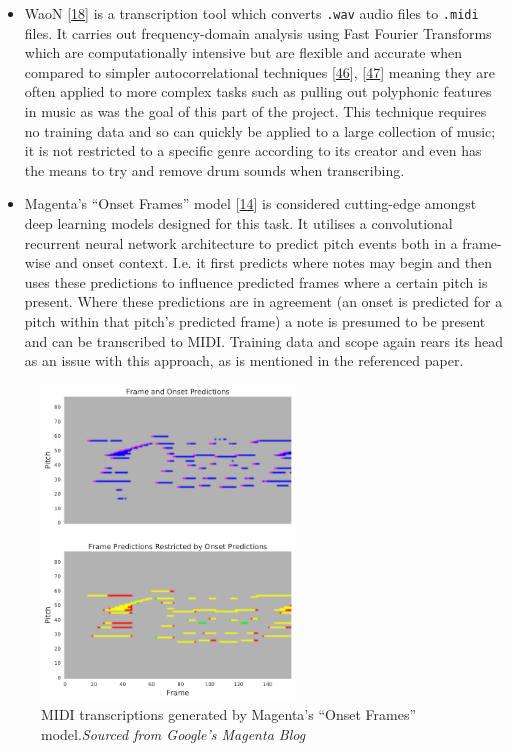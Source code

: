 \documentclass[12pt,]{article}
\providecommand{\tightlist}{%
  \setlength{\itemsep}{0pt}\setlength{\parskip}{0pt}}
\begin{document}
\begin{itemize}
\tightlist
\item
  WaoN {[}\protect\hyperlink{ref-waon}{18}{]} is a transcription tool
  which converts \texttt{.wav} audio files to \texttt{.midi} files. It
  carries out frequency-domain analysis using Fast Fourier Transforms
  which are computationally intensive but are flexible and accurate when
  compared to simpler autocorrelational techniques
  {[}\protect\hyperlink{ref-klapuri2004automatic}{46}{]},
  {[}\protect\hyperlink{ref-gerhard2003pitch}{47}{]} meaning they are
  often applied to more complex tasks such as pulling out polyphonic
  features in music as was the goal of this part of the project. This
  technique requires no training data and so can quickly be applied to a
  large collection of music; it is not restricted to a specific genre
  according to its creator and even has the means to try and remove drum
  sounds when transcribing.
\item
  Magenta's ``Onset Frames'' model
  {[}\protect\hyperlink{ref-hawthorne2017onsets}{14}{]} is considered
  cutting-edge amongst deep learning models designed for this task. It
  utilises a convolutional recurrent neural network architecture to
  predict pitch events both in a frame-wise and onset context. I.e. it
  first predicts where notes may begin and then uses these predictions
  to influence predicted frames where a certain pitch is present. Where
  these predictions are in agreement (an onset is predicted for a pitch
  within that pitch's predicted frame) a note is presumed to be present
  and can be transcribed to MIDI. Training data and scope again rears
  its head as an issue with this approach, as is mentioned in the
  referenced paper.
\end{itemize}

\begin{figure}
\centering
\includegraphics[width=0.6\textwidth,height=\textheight]{Images/frames.png}
\caption{MIDI transcriptions generated by Magenta's ``Onset Frames''
model.\newline\textit{Sourced from Google's Magenta Blog}}
\end{figure}
\end{document}
